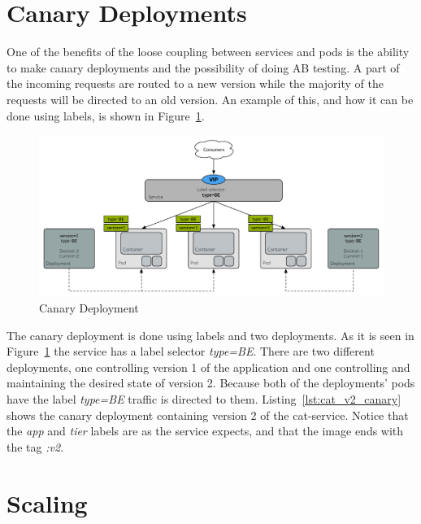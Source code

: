 


\section*{Canary Deployments}

One of the benefits of the loose coupling between services and pods is the ability to make canary deployments and the possibility of doing A\/B testing. A part of the incoming requests are routed to a new version while the majority of the requests will be directed to an old version. An example of this, and how it can be done using labels, is shown in Figure~\ref{fig:canary_deployment}.
\newpage
\begin{figure}[H]
    \centering
    \includegraphics[width=15cm]{figures/kubernetes/canary_deployment}
    \caption{Canary Deployment}
    \label{fig:canary_deployment}
\end{figure}

\noindent The canary deployment is done using labels and two deployments. As it is seen in Figure~\ref{fig:canary_deployment} the service has a label selector \textit{type=BE}. There are two different deployments, one controlling version 1 of the application and one controlling and maintaining the desired state of version 2. Because both of the deployments' pods have the label \textit{type=BE} traffic is directed to them. Listing~\ref{lst:cat_v2_canary} shows the canary deployment containing version 2 of the cat-service. Notice that the \textit{app} and \textit{tier} labels are as the service expects, and that the image ends with the tag \textit{:v2}. \\





\section*{Scaling}

